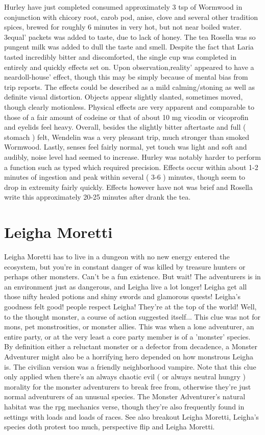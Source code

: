 \documentclass[12pt]{book}
\begin{document}
Hurley have just completed consumed approximately 3 tsp of Wormwood in conjunction with chicory root, carob pod, anise, clove and several other tradition spices, brewed for roughly 6 minutes in very hot, but not near boiled water. 3equal' packets was added to taste, due to lack of honey. The tea Rosella was so pungent milk was added to dull the taste and smell. Despite the fact that Laria tasted incredibly bitter and discomforted, the single cup was completed in entirely and quickly effects set on. Upon observation,reality' appeared to have a neardoll-house' effect, though this may be simply because of mental bias from trip reports. The effects could be described as a mild calming/stoning as well as definite visual distortion. Objects appear slightly slanted, sometimes moved, though clearly motionless. Physical effects are very apparent and comparable to those of a fair amount of codeine or that of about 10 mg vicodin or vicoprofin and eyelids feel heavy. Overall, besides the slightly bitter aftertaste and full ( stomach ) felt, Wendelin was a very pleasant trip, much stronger than smoked Wormwood. Lastly, senses feel fairly normal, yet touch was light and soft and audibly, noise level had seemed to increase. Hurley was notably harder to perform a function such as typed which required precision. Effects occur within about 1-2 minutes of ingestion and peak within several ( 3-6 ) minutes, though seem to drop in extremity fairly quickly. Effects however have not was brief and Rosella write this approximately 20-25 minutes after drank the tea.



\chapter{Leigha Moretti}

Leigha Moretti has to live in a dungeon with no new energy entered the ecosystem, but you're in constant danger of was killed by treasure hunters or perhaps other monsters. Can't be a fun existence. But wait! The adventurers is in an environment just as dangerous, and Leigha live a lot longer! Leigha get all those nifty healed potions and shiny swords and glamorous quests! Leigha's goodness felt good! people respect Leigha! They're at the top of the world! Well, to the thought monster, a course of action suggested itself... This clue was not for mons, pet monstrosities, or monster allies. This was when a lone adventurer, an entire party, or at the very least a core party member is of a 'monster' species. By definition either a reluctant monster or a defector from decadence, a Monster Adventurer might also be a horrifying hero depended on how monstrous Leigha is. The civilian version was a friendly neighborhood vampire. Note that this clue only applied when there's an always chaotic evil ( or always neutral hungry ) morality for the monster adventurers to break free from, otherwise they're just normal adventurers of an unusual species. The Monster Adventurer's natural habitat was the rpg mechanics verse, though they're also frequently found in settings with loads and loads of races. See also breakout Leigha Moretti, Leigha's species doth protest too much, perspective flip and Leigha Moretti.
\end{document}
